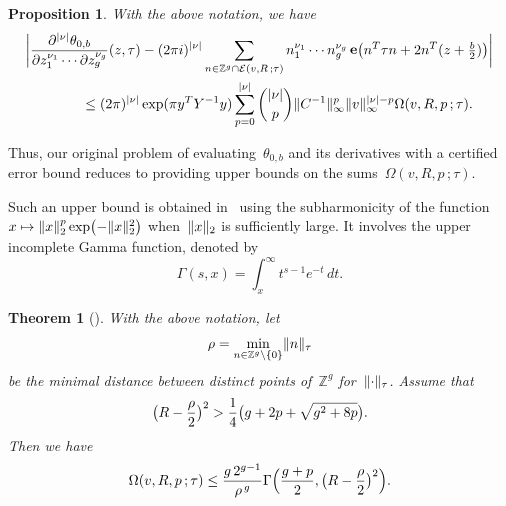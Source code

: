 \documentclass[12pt,oneside]{amsart}
\numberwithin{equation}{section}
\newtheorem{prop}[equation]{Proposition}
\newtheorem{thm}[equation]{Theorem}
\theoremstyle{definition}
\newcommand{\Z}{\mathbb{Z}}
\newcommand{\eld}[3]{\ensuremath{\mathcal{E}(#1, #2\,; #3)}}
\newcommand{\tailsum}[4]{\ensuremath{\Omega(#1,#2,#3\,;#4)}}
\DeclareMathOperator{\e}{\mathbf{e}}
\DeclarePairedDelimiter{\abs}{|}{|}
\DeclarePairedDelimiter{\paren}{(}{)}
\DeclarePairedDelimiter{\norm}{\|}{\|}
\begin{document}
\begin{prop}
  \label{prop:theta-tail} With the above notation, we have
  \begin{align*}
    &\abs[\bigg]{\frac{\partial^{\abs{\nu}} \theta_{0,b}}{\partial z_1^{\nu_1}\cdots\partial z_{g}^{\nu_g}}(z,\tau)
      - (2 \pi i)^{\abs{\nu}} \sum_{n\in \Z^g \cap \eld{v}{R}{\tau}} n_1^{\nu_1}\cdots n_{g}^{\nu_{g}}
      \e\paren[\big]{n^T\tau n + 2n^T(z + \tfrac b2)} } \\
    &\qquad\qquad \leq (2\pi)^{\abs{\nu}} \exp(\pi y^TY^{-1}y) \sum_{p=0}^{\abs{\nu}} \binom{\abs{\nu}}{p} \norm{C^{-1}}_\infty^p \norm{v}_\infty^{\abs{\nu}-p} \tailsum{v}{R}{p}{\tau}.
  \end{align*}
\end{prop}

Thus, our original problem of evaluating~$\theta_{0,b}$ and its derivatives
with a certified error bound reduces to providing upper bounds on the
sums~$\tailsum{v}{R}{p}{\tau}$.

Such an upper bound is obtained in~\cite{deconinckComputingRiemannTheta2004}
using the subharmonicity of the function
$x\mapsto \norm{x}_2^p \exp \paren[\big]{-\norm{x}_2^2}$ when~$\norm{x}_2$ is
sufficiently large. It involves the upper incomplete Gamma function, denoted
by
\begin{equation}
  \label{eq:incomplete-gamma}
  \Gamma(s, x) = \int_x^\infty t^{s-1}e^{-t} \,dt.
\end{equation}

\begin{thm}[{\cite[Lemma 2]{deconinckComputingRiemannTheta2004}}]
  \label{thm:summation-bound-old}
  With the above notation, let
  \begin{displaymath}
    \rho = \min_{n\in \Z^g\setminus\{0\}} \norm{n}_\tau
  \end{displaymath}
  be the minimal distance between distinct points of~$\Z^g$
  for~$\norm{\cdot}_\tau$. Assume that
  \begin{displaymath}
    \paren[\big]{R - \frac{\rho}{2}}^2 > \frac 14\paren[\big]{g + 2p + \sqrt{g^2 + 8p}}.
  \end{displaymath}
  Then we have
  \begin{displaymath}
    \tailsum{v}{R}{p}{\tau}
    \leq \frac{g\, 2^{g-1}}{\rho^{\,g}} \Gamma\paren[\Big]{\frac{g + p}{2},
      \paren[\big]{R - \frac{\rho}{2}}^2}.
  \end{displaymath}
\end{thm}
\end{document}

